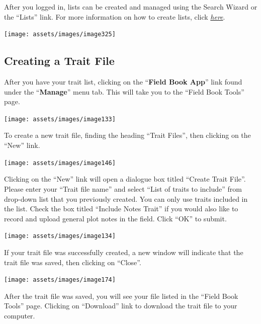 \documentclass[
  12pt,
]{book}
\begin{document}
After you logged in, lists can be created and managed using the Search Wizard or the ``Lists'' link. For more information on how to create lists, click \protect\hyperlink{working-with-lists}{\emph{here}}.

\begin{center}\texttt{[image: assets/images/image325]} \end{center}

\hypertarget{creating-a-trait-file}{%
\subsection{Creating a Trait File}\label{creating-a-trait-file}}

After you have your trait list, clicking on the ``\textbf{Field Book App}'' link found under the ``\textbf{Manage}'' menu tab. This will take you to the ``Field Book Tools'' page.

\begin{center}\texttt{[image: assets/images/image133]} \end{center}

To create a new trait file, finding the heading ``Trait Files'', then clicking on the ``New'' link.

\begin{center}\texttt{[image: assets/images/image146]} \end{center}

Clicking on the ``New'' link will open a dialogue box titled ``Create Trait File''. Please enter your ``Trait file name'' and select ``List of traits to include'' from drop-down list that you previously created. You can only use traits included in the list. Check the box titled ``Include Notes Trait'' if you would also like to record and upload general plot notes in the field. Click ``OK'' to submit.

\begin{center}\texttt{[image: assets/images/image134]} \end{center}

If your trait file was successfully created, a new window will indicate that the trait file was saved, then clicking on ``Close''.

\begin{center}\texttt{[image: assets/images/image174]} \end{center}

After the trait file was saved, you will see your file listed in the ``Field Book Tools'' page. Clicking on ``Download'' link to download the trait file to your computer.
\end{document}
